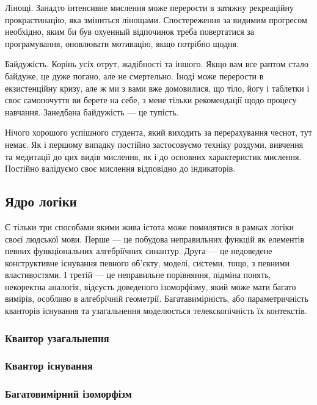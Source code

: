 Лінощі. Занадто інтенсивне мислення може перерости в затяжну
рекреаційну прокрастинацію, яка зміниться лінощами.
Спостереження за видимим прогресом необхідно, яким би був
охуенный відпочинок треба повертатися за програмування,
оновлювати мотивацію, якщо потрібно щодня.

Байдужість. Корінь усіх отрут, жадібності та іншого. Якщо
вам все раптом стало байдуже, це дуже погано, але не смертельно.
Іноді може перерости в екзистенційну кризу, але ж ми з вами вже
домовилися, що тіло, йогу і таблетки і своє самопочуття ви
берете на себе, з мене тільки рекомендації щодо процесу
навчання. Занедбана байдужість --- це тупість.

Нічого хорошого успішного студента, який виходить за
перерахування чеснот, тут немає. Як і першому випадку
постійно застосовуємо техніку роздуми, вивчення та
медитації до цих видів мислення, як і до основних характеристик
мислення. Постійно валідуємо своє мислення відповідно
до індикаторів.

\subsection{Ядро логіки}

Є тільки три способами якими жива істота може помилятися в рамках
логіки своєї людської мови. Перше --- це побудова неправильних
функцій як елементів певних функціональних алгебріїчних синантур.
Друга --- це недоведене конструктивне існування певного об'єкту,
моделі, системи, тощо, з певними властивостями. І третій --- це
неправильне порівняння, підміна понять, некоректна аналогія,
відсусть доведеного ізоморфізму, який може мати багато вимірів,
особливо в алгебрїчній геометрії. Багатавимірність, або параметричність
кванторів існування та узагальнення моделюється телекскопічність їх
контекстів.

\subsubsection{Квантор узагальнення}



\subsubsection{Квантор існування}

\subsubsection{Багатовимірний ізоморфізм}

\normalsize
